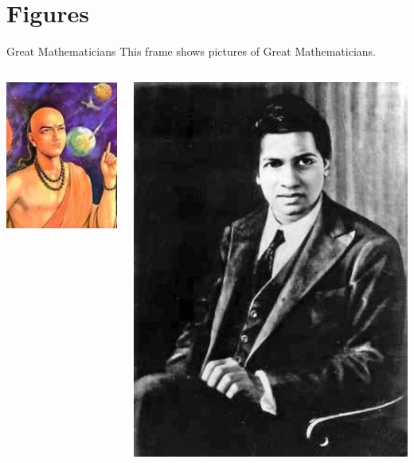 \documentclass{beamer}
\begin{document}
\section{Figures}
\begin{frame}{Great Mathematicians}
This frame shows pictures of Great Mathematicians.
\begin{columns}
\hspace{2.4em}
\begin{column}{0.31\textwidth}
\includegraphics[scale=0.4]{aryabhatta.jpeg}
\end{column}
\begin{column}{0.8\textwidth}
\includegraphics[scale=0.09]{Srinivasa.jpg}

\end{column}
\end{columns}
\end{frame}
\end{document}

